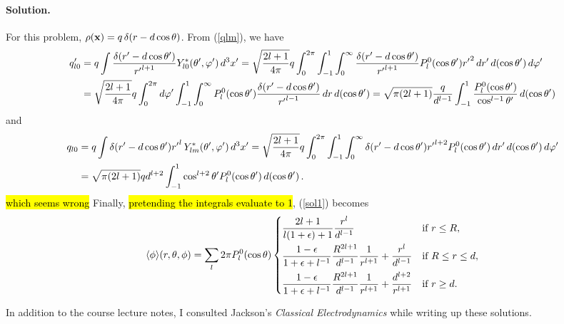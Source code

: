 \documentclass[11pt]{article}
\newcommand{\refeq}[1]{(\ref{#1})}
\newcommand{\beq}{\begin{equation*}}
\newcommand{\eeq}{\end{equation*}}
\newenvironment{solution}
{
    \paragraph{Solution.}
    \ignorespaces
}
{
    \bigskip
}
\begin{document}
\begin{solution}
	For this problem, $\rho(\vb{x}) = q \,\delta(r - d\cos\theta)$.  From \refeq{qlm}, we have
	\begin{align*}
		q'_{l 0} &= q \int \frac{\delta(r' - d\cos\theta')}{{r'}^{l+1}} Y_{l 0}^*(\theta', \varphi') \dd[3]{x'}
		= \sqrt{\frac{2l + 1}{4\pi}} q \int_0^{2\pi} \int_{-1}^{1} \int_0^\infty \frac{\delta(r' - d\cos\theta')}{{r'}^{l+1}} P_l^0(\cos\theta') {r'}^2 \dd{r'} \dd{(\cos\theta')} \dd{\varphi'} \\
		&= \sqrt{\frac{2l + 1}{4\pi}} q \int_0^{2\pi} \dd{\varphi'} \int_{-1}^{1} \int_0^\infty P_l^0(\cos\theta') \frac{\delta(r' - d\cos\theta')}{{r'}^{l-1}} \dd{r} \dd{(\cos\theta')}
		= \sqrt{\pi (2l + 1)} \frac{q}{d^{l-1}} \int_{-1}^{1} \frac{P_l^0(\cos\theta')}{\cos^{l-1}\theta'} \dd{(\cos\theta')}
	\end{align*}
	and
	\begin{align*}
		q_{l 0} &= q \int \delta(r' - d\cos\theta') {r'}^l \, Y_{l m}^*(\theta', \varphi') \dd[3]{x'}
		= \sqrt{\frac{2l + 1}{4\pi}} q \int_0^{2\pi} \int_{-1}^{1} \int_0^\infty \delta(r' - d\cos\theta') {r'}^{l+2} P_l^0(\cos\theta') \dd{r'} \dd{(\cos\theta')} \dd{\varphi'} \\
		&= \sqrt{\pi (2l + 1)} q d^{l+2} \int_{-1}^{1} \cos^{l+2}\theta' P_l^0(\cos\theta') \dd{(\cos\theta')}.
	\end{align*}
	\hl{which seems wrong}
	Finally, \hl{pretending the integrals evaluate to 1}, \refeq{sol1} becomes
	\beq
		\evphi\!\rtp = \sum_{l} 2\pi \Ploct \begin{cases}
			\dfrac{2l + 1}{l (1 + \eps) + 1} \dfrac{r^l}{d^{l-1}} & \tif r \leq R, \\[2ex]
			\dfrac{1 - \eps}{1 + \eps + l^{-1}} \dfrac{R^{2l+1}}{d^{l-1}} \dfrac{1}{r^{l+1}} + \dfrac{r^l}{d^{l-1}} & \tif R \leq r \leq d, \\[2ex]
			\dfrac{1 - \eps}{1 + \eps + l^{-1}} \dfrac{R^{2l+1}}{d^{l-1}} \dfrac{1}{r^{l+1}} + \dfrac{d^{l+2}}{r^{l+1}} & \tif r \geq d.
		\end{cases}
	\eeq
\end{solution}


\clearpage




\vfill
In addition to the course lecture notes, I consulted Jackson's \emph{Classical Electrodynamics} while writing up these solutions.
\end{document}
